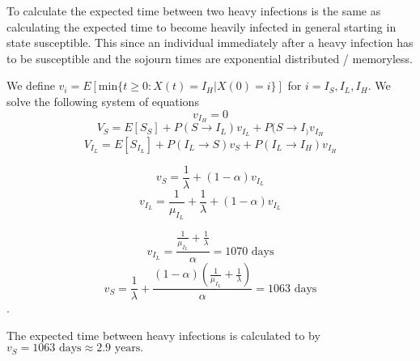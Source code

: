 To calculate the expected time between two heavy infections is the same as calculating the expected time to become heavily infected in general starting in state susceptible. This since an individual immediately after a heavy infection  has to be susceptible and the sojourn times are exponential distributed / memoryless. 

We define $v_i = E[\text{min}\{t \geq 0: X(t) = I_H | X(0) = i\}]$ for $i = I_S, I_L, I_H$. We solve the following system of equations
$$v_{I_H} = 0$$
$$V_{S} = E[S_S] + P(S \rightarrow I_L) v_{I_L}+ P(S \rightarrow I_) v_{I_H} $$
$$V_{I_L} = E[S_{I_L}] + P(I_L \rightarrow S) v_S + P(I_L \rightarrow I_H) v_{I_H} $$


$$ v_{S} = \frac{1}{\lambda} + (1-\alpha) v_{I_L} $$
$$ v_{I_L} =  \frac{1}{\mu_{I_L}}+  \frac{1}{\lambda} + (1-\alpha) v_{I_L} $$

$$ v_{I_L} =  \frac{\frac{1}{\mu_{I_L}} +  \frac{1}{\lambda}}{\alpha} = 1070 \text{ days}$$
$$ v_S =  \frac{1}{\lambda} + \frac{ (1-\alpha)(\frac{1}{\mu_{I_L}} +  \frac{1}{\lambda})}{\alpha} = 1063 \text{ days} $$. 

The expected time between heavy infections is calculated to by $v_S = 1063 \text{ days} \approx 2.9 \text{ years.}$




